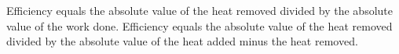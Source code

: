 Efficiency equals the absolute value of the heat removed divided by the absolute value of the work done.  
Efficiency equals the absolute value of the heat removed divided by the absolute value of the heat added minus the heat removed.